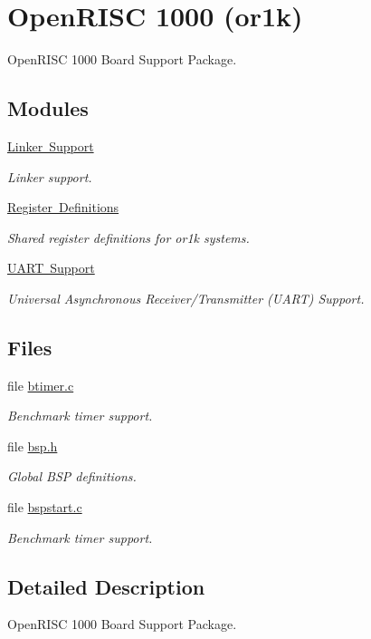 \hypertarget{group__RTEMSBSPsOR1K}{}\section{Open\+R\+I\+SC 1000 (or1k)}
\label{group__RTEMSBSPsOR1K}


Open\+R\+I\+SC 1000 Board Support Package.  


\subsection*{Modules}
\begin{DoxyCompactItemize}
\item 
\mbox{\hyperlink{group__RTEMSBSPsOR1KSharedLinker}{Linker Support}}
\begin{DoxyCompactList}\small\item\em Linker support. \end{DoxyCompactList}\item 
\mbox{\hyperlink{group__generic__or1k__reg}{Register Definitions}}
\begin{DoxyCompactList}\small\item\em Shared register definitions for or1k systems. \end{DoxyCompactList}\item 
\mbox{\hyperlink{group__generic__or1k__uart}{U\+A\+R\+T Support}}
\begin{DoxyCompactList}\small\item\em Universal Asynchronous Receiver/\+Transmitter (U\+A\+RT) Support. \end{DoxyCompactList}\end{DoxyCompactItemize}
\subsection*{Files}
\begin{DoxyCompactItemize}
\item 
file \mbox{\hyperlink{or1k_2generic__or1k_2btimer_2btimer_8c}{btimer.\+c}}
\begin{DoxyCompactList}\small\item\em Benchmark timer support. \end{DoxyCompactList}\item 
file \mbox{\hyperlink{bsps_2or1k_2generic__or1k_2include_2bsp_8h}{bsp.\+h}}
\begin{DoxyCompactList}\small\item\em Global B\+SP definitions. \end{DoxyCompactList}\item 
file \mbox{\hyperlink{or1k_2generic__or1k_2start_2bspstart_8c}{bspstart.\+c}}
\begin{DoxyCompactList}\small\item\em Benchmark timer support. \end{DoxyCompactList}\end{DoxyCompactItemize}


\subsection{Detailed Description}
Open\+R\+I\+SC 1000 Board Support Package. 

